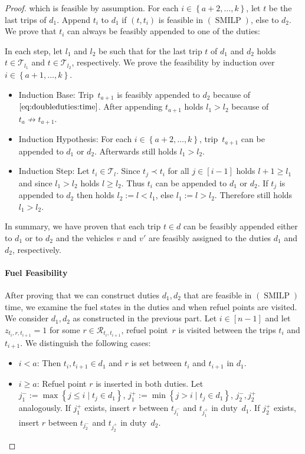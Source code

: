 \begin{proof}
which is feasible by assumption. For each ${i\in\left\{a+2,\dots, k\right\}}$, let $t$ be the last trips of $d_1$. Append $t_i$ to $d_1$ if $\left(t,t_i\right)$ is feasible in $(\operatorname{SMILP})$, else to $d_2$. We prove that $t_i$ can always be feasibly appended to one of the duties:

In each step, let $l_1$ and $l_2$ be such that for the last trip $t$ of $d_1$ and $d_2$ holds ${t\in\mathcal{T}_{l_1}}$ and ${t\in\mathcal{T}_{l_2}}$, respectively. We prove the feasibility by induction over ${i\in\left\{a+1,\dots, k\right\}}$.
\begin{itemize}
	\item{Induction Base:}
		Trip~$t_{a+1}$ is feasibly appended to $d_2$ because of $\eqref{eq:doubleduties:time}$. After appending $t_{a+1}$ holds ${l_1>l_2}$ because of $t_a\not\to t_{a+1}$. 
	\item{Induction Hypothesis:} 
		For each ${i\in\left\{a+2,\dots, k\right\}}$, trip~$t_{a+1}$ can be appended to $d_1$ or $d_2$. Afterwards still holds ${l_1>l_2}$.
	\item{Induction Step:}
		Let ${t_i\in\mathcal{T}_l}$. Since $t_j\prec t_i$ for all ${j\in[i-1]}$ holds ${l+1\geq l_1}$ and since ${l_1>l_2}$ holds ${l\geq l_2}$. Thus $t_i$ can be appended to $d_1$ or $d_2$. If $t_j$ is appended to $d_2$ then holds ${l_2 := l<l_1}$, else ${l_1 := l>l_2}$. Therefore still holds ${l_1>l_2}$.
\end{itemize}

In summary, we have proven that each trip ${t\in d}$ can be feasibly appended either to $d_1$ or to $d_2$ and the vehicles $v$ and $v'$ are feasibly assigned to the duties $d_1$ and $d_2$, respectively.

\paragraph{Fuel Feasibility} \proofparfill

After proving that we can construct duties $d_1,d_2$ that are feasible in $(\operatorname{SMILP})$ \wrt time, we examine the fuel states in the duties and when refuel points are visited. We consider $d_1,d_2$ as constructed in the previous part. Let $i\in[n-1]$ and let ${z_{t_i,r,t_{i+1}}=1}$ for some ${r\in\mathcal{R}_{t_i,t_{i+1}}}$, \ie refuel point~$r$ is visited between the trips $t_i$ and $t_{i+1}$. We distinguish the following cases:
\begin{itemize}
	\item{$i<a$:}
		Then ${t_i,t_{i+1}\in d_1}$ and $r$ is set between $t_i$ and $t_{i+1}$ in $d_1$.
	\item{$i\geq a$:}
		Refuel point $r$ is inserted in both duties. Let ${j^-_1:=\max\left\{j\leq i\mid t_j\in d_1\right\}}$, ${j^+_1:=\min\left\{j>i\mid t_j\in d_1\right\}}$, $j^-_2,j^+_2$ analogously. If $j^+_1$ exists, insert $r$ between $t_{j^-_1}$ and $t_{j^+_1}$ in duty~$d_1$. If $j^+_2$ exists, insert $r$ between $t_{j^-_2}$ and $t_{j^+_2}$ in duty~$d_2$.
\end{itemize}


\end{proof}
